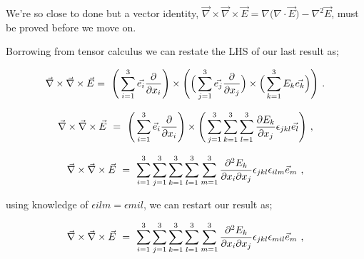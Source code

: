 \documentclass{article}
\begin{document}
We're so close to done but a vector identity, \begin{math} \vec{\nabla}\times\vec{\nabla}\times\vec{E} = \nabla\big(\nabla\cdot\vec{E}\big) - \nabla^{2}\vec{E} \end{math}, must be proved before we move on.

Borrowing from tensor calculus we can restate the LHS of our last result as; 

\begin{equation} \label{eb-eq-1002-4}
\vec{\nabla}\times\vec{\nabla}\times\vec{E} = \hspace{0.125cm} \Bigg( \sum_{i=1}^{3} \vec{e_{i}} \frac{\partial}{\partial x_i} \Bigg)\times\Bigg( \Big( \sum_{j=1}^{3} \vec{e_j} \frac{\partial}{\partial x_j} \Big)\times\Big( \sum_{k=1}^{3} E_k \vec{e_k}\Big) \Bigg) \hspace{0.125cm}. 
\end{equation}

\begin{equation} \label{eb-eq-51-36}
\vec{\nabla}\times\vec{\nabla}\times\vec{E} \hspace{0.125cm} = \hspace{0.125cm} \Bigg( \sum_{i=1}^{3} \vec{e}_i \frac{\partial}{\partial x_i} \Bigg)\times\Bigg( \sum_{j=1}^{3} \sum_{k=1}^{3} \sum_{l=1}^{3} \frac{\partial{E_k}}{\partial x_j}  \epsilon_{jkl} \vec{e_l} \Bigg) \hspace{0.125cm} ,
\end{equation}

\begin{equation} \label{eb-eq-51-37}
\vec{\nabla}\times\vec{\nabla}\times\vec{E} \hspace{0.125cm} = \hspace{0.125cm} \sum_{i=1}^{3} \sum_{j=1}^{3} \sum_{k=1}^{3} \sum_{l=1}^{3} \sum_{m=1}^{3} \frac{\partial^{2}{E_k}}{\partial{x_i}\partial{x_j}} \epsilon_{jkl} \epsilon_{ilm} \vec{e}_m \hspace{0.125cm} ,
\end{equation}

using knowledge of \begin{math} \epsilon{ilm} = \epsilon{mil} \end{math}, we can restart our result as;

\begin{equation} \label{eb-eq-51-38}
\vec{\nabla}\times\vec{\nabla}\times\vec{E} \hspace{0.125cm} = \hspace{0.125cm} \sum_{i=1}^{3} \sum_{j=1}^{3} \sum_{k=1}^{3} \sum_{l=1}^{3} \sum_{m=1}^{3} \frac{\partial^{2}{E_k}}{\partial{x_i}\partial{x_j}} \epsilon_{jkl} \epsilon_{mil} \vec{e}_m \hspace{0.125cm} ,
\end{equation}
\end{document}
